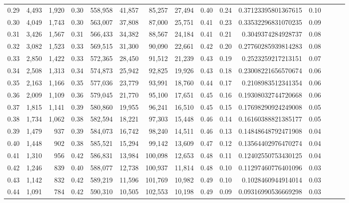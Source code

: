 \begin{tabular}{rrrrrrrrrrrrrrr}
0.29 &   4,493 &  1,920 &  0.30 &  558,958 &   41,857 &   85,257 &   27,494 &  0.40 &  0.24 &     0.37123395801367615 &      0.10 \\
0.30 &   4,049 &  1,743 &  0.30 &  563,007 &   37,808 &   87,000 &   25,751 &  0.41 &  0.23 &     0.33532296831070235 &      0.09 \\
0.31 &   3,426 &  1,567 &  0.31 &  566,433 &   34,382 &   88,567 &   24,184 &  0.41 &  0.21 &      0.3049374284928737 &      0.08 \\
0.32 &   3,082 &  1,523 &  0.33 &  569,515 &   31,300 &   90,090 &   22,661 &  0.42 &  0.20 &     0.27760285939814283 &      0.08 \\
0.33 &   2,850 &  1,422 &  0.33 &  572,365 &   28,450 &   91,512 &   21,239 &  0.43 &  0.19 &      0.2523259217213151 &      0.07 \\
0.34 &   2,508 &  1,313 &  0.34 &  574,873 &   25,942 &   92,825 &   19,926 &  0.43 &  0.18 &     0.23008221656570674 &      0.06 \\
0.35 &   2,163 &  1,166 &  0.35 &  577,036 &   23,779 &   93,991 &   18,760 &  0.44 &  0.17 &      0.2108983512341354 &      0.06 \\
0.36 &   2,009 &  1,109 &  0.36 &  579,045 &   21,770 &   95,100 &   17,651 &  0.45 &  0.16 &     0.19308032744720668 &      0.06 \\
0.37 &   1,815 &  1,141 &  0.39 &  580,860 &   19,955 &   96,241 &   16,510 &  0.45 &  0.15 &     0.17698290924249008 &      0.05 \\
0.38 &   1,734 &  1,062 &  0.38 &  582,594 &   18,221 &   97,303 &   15,448 &  0.46 &  0.14 &     0.16160388821385177 &      0.05 \\
0.39 &   1,479 &    937 &  0.39 &  584,073 &   16,742 &   98,240 &   14,511 &  0.46 &  0.13 &     0.14848648792471908 &      0.04 \\
0.40 &   1,448 &    902 &  0.38 &  585,521 &   15,294 &   99,142 &   13,609 &  0.47 &  0.12 &     0.13564402976470274 &      0.04 \\
0.41 &   1,310 &    956 &  0.42 &  586,831 &   13,984 &  100,098 &   12,653 &  0.48 &  0.11 &     0.12402550753430125 &      0.04 \\
0.42 &   1,246 &    839 &  0.40 &  588,077 &   12,738 &  100,937 &   11,814 &  0.48 &  0.10 &     0.11297460776401096 &      0.03 \\
0.43 &   1,142 &    832 &  0.42 &  589,219 &   11,596 &  101,769 &   10,982 &  0.49 &  0.10 &      0.1028460944914014 &      0.03 \\
0.44 &   1,091 &    784 &  0.42 &  590,310 &   10,505 &  102,553 &   10,198 &  0.49 &  0.09 &     0.09316990536669298 &      0.03 \\

\end{tabular}
